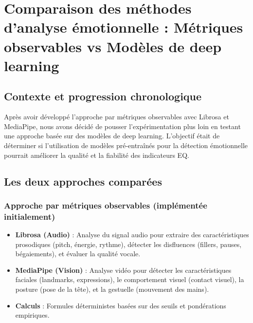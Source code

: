 \documentclass[12pt,a4paper]{article}
\begin{document}
\section{Comparaison des méthodes d'analyse émotionnelle : Métriques observables vs Modèles de deep learning}

\subsection{Contexte et progression chronologique}

Après avoir développé l'approche par métriques observables avec Librosa et MediaPipe, nous avons décidé de pousser l'expérimentation plus loin en testant une approche basée sur des modèles de deep learning. L'objectif était de déterminer si l'utilisation de modèles pré-entraînés pour la détection émotionnelle pourrait améliorer la qualité et la fiabilité des indicateurs EQ.

\subsection{Les deux approches comparées}

\subsubsection{Approche par métriques observables (implémentée initialement)}
\begin{itemize}
    \item \textbf{Librosa (Audio)} : Analyse du signal audio pour extraire des caractéristiques prosodiques (pitch, énergie, rythme), détecter les disfluences (fillers, pauses, bégaiements), et évaluer la qualité vocale.
    \item \textbf{MediaPipe (Vision)} : Analyse vidéo pour détecter les caractéristiques faciales (landmarks, expressions), le comportement visuel (contact visuel), la posture (pose de la tête), et la gestuelle (mouvement des mains).
    \item \textbf{Calculs} : Formules déterministes basées sur des seuils et pondérations empiriques.
\end{itemize}
\end{document}

